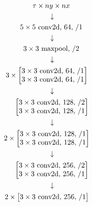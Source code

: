     \begin{gather*}
        \hphantom{3 \times} \tau \times ny \times nx \\
        \hphantom{3 \times} \downarrow\\
        \hphantom{3 \times} 5 \times 5 \text{ conv2d, } 64, \, /1\\
        \hphantom{3 \times}\downarrow\\
        \hphantom{3 \times} 3 \times 3 \text{ maxpool, } /2\\
        \hphantom{3 \times} \downarrow\\
        3 \times 
        \begin{bmatrix}
            3 \times 3 \text{ conv2d, } 64, \, /1\\
            3 \times 3 \text{ conv2d, } 64, \, /1\\
        \end{bmatrix}\\
        \hphantom{3 \times} \downarrow\\
        \hphantom{3 \times} \begin{bmatrix}
            3 \times 3 \text{ conv2d, } 128, \, /2\\
            3 \times 3 \text{ conv2d, } 128, \, /1\\
        \end{bmatrix}\\
        \hphantom{3 \times} \downarrow\\
        2 \times 
        \begin{bmatrix}
            3 \times 3 \text{ conv2d, } 128, \, /1\\
            3 \times 3 \text{ conv2d, } 128, \, /1\\
        \end{bmatrix}\\
        \hphantom{3 \times} \downarrow\\
        \hphantom{3 \times}
        \begin{bmatrix}
            3 \times 3 \text{ conv2d, } 256, \, /2\\
            3 \times 3 \text{ conv2d, } 256, \, /1\\
        \end{bmatrix}\\
        \hphantom{3 \times} \downarrow\\
        2 \times 
        \begin{bmatrix}
            3 \times 3 \text{ conv2d, } 256, \, /1\\

\end{bmatrix}
\end{gather*}
